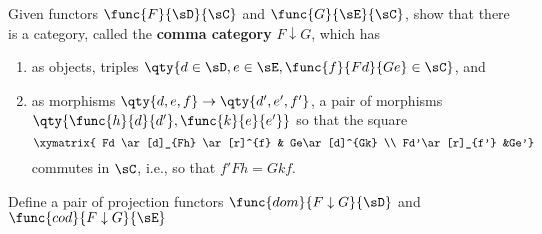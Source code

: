 \documentclass[main.tex]{subfiles}
\begin{document}

\begin{exercise}
	Given functors $\func{F}{\sD}{\sC}$ and $\func{G}{\sE}{\sC}$, show that
	there is a category, called the {\bf comma category} $F\downarrow G$, which
	has
	\begin{enumerate}
		\item as objects, triples $\qty{d \in \sD,e \in \sE, \func{f}{Fd}{Ge}
			\in \sC}$, and

		\item as morphisms $\qty{d,e,f}\rightarrow \qty{d',e',f'}$, a pair of
			morphisms $\qty{\func{h}{d}{d'},\func{k}{e}{e'}}$ so that the square
			\[\xymatrix{
					Fd \ar[d]_{Fh} \ar[r]^{f} & Ge\ar[d]^{Gk}  \\
			Fd'\ar[r]_{f'} &Ge'}\]
			commutes in $\sC$, i.e., so that $f' Fh = Gk  f$.
	\end{enumerate}
	Define a pair of projection functors $\func{dom}{F\downarrow G}{\sD}$ and
	$\func{cod}{F\downarrow G}{\sE}$
\end{exercise}
\end{document}
